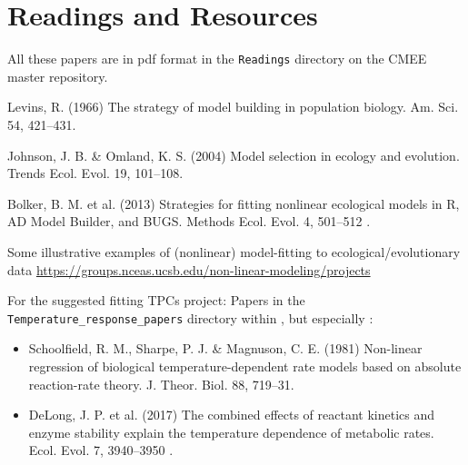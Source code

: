\section{Readings and Resources}

All these papers are in pdf format in the {\tt Readings} directory on the CMEE master repository. 

\begin{compactitem} \itemsep6pt
\item Levins, R. (1966) The strategy of model building in population 
biology. Am. Sci. 54, 421--431.  

\item Johnson, J. B. \& Omland, K. S. (2004) Model selection in ecology 
and evolution. Trends Ecol. Evol. 19, 101--108. 

\item Bolker, B. M. et al.  (2013) Strategies for fitting nonlinear ecological models in R, AD Model Builder, and BUGS. Methods Ecol. Evol. 4, 501--512 .

\item Some illustrative examples of (nonlinear) model-fitting to 
ecological/evolutionary data 
\url{https://groups.nceas.ucsb.edu/non-linear-modeling/projects} 

\item For the suggested fitting TPCs project: Papers in the {\tt 
Temperature\_response\_papers} directory within , but especially : 


\begin{itemize}
	
\item Schoolfield, R. M., Sharpe, P. J. \& Magnuson, C. E. (1981) Non-linear 
regression of biological temperature-dependent rate models based on 
absolute reaction-rate theory. J. Theor. Biol. 88, 719--31. 

\item DeLong, J. P. et al. (2017) The combined effects of reactant kinetics and enzyme stability explain the temperature dependence of metabolic rates. Ecol. Evol. 7, 3940--3950 .

\end{itemize}

\end{compactitem}
